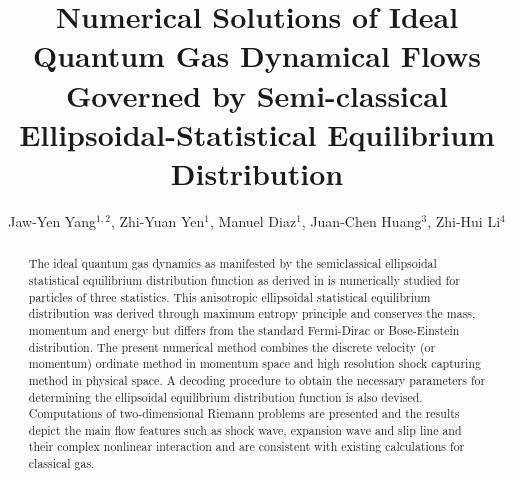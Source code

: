 \documentclass{rsproca}%
\begin{document}
\title{Numerical Solutions of Ideal Quantum Gas Dynamical Flows Governed by Semi-classical Ellipsoidal-Statistical Equilibrium Distribution}

\author{%
Jaw-Yen Yang$^{1,2}$, Zhi-Yuan Yen$^{1}$, Manuel Diaz$^{1}$, Juan-Chen Huang$^{3}$, Zhi-Hui Li$^{4}$}

\address{$^{1}$Institute of Applied Mechanics, National Taiwan University, Taipei 10764, TAIWAN\\
$^{2}$Center for Advanced Study in Theoretical Science, National Taiwan University, Taipei 10764, TAIWAN\\
$^{3}$Department of Merchant, National Taiwan Ocean University, Taipei 10764, TAIWAN\\
$^{4}$China Aerodynamics Research and Development Center, Mianyang, 10764, CHINA}


\subject{Mesoscopic Methods, Semi-classical Botlzmann Transport, Ellipsoidal Statistics, Kinetic Theory, Quantum shock waves}



\begin{abstract}
The ideal quantum gas dynamics as manifested by the semiclassical ellipsoidal statistical equilibrium distribution function as derived in \cite{Wu2012} is numerically studied for particles of three statistics.  This anisotropic ellipsoidal statistical equilibrium distribution was derived through maximum entropy principle and conserves the mass, momentum and energy but differs from the standard Fermi-Dirac or Bose-Einstein distribution. The present numerical method combines the discrete velocity (or momentum) ordinate method in momentum space and high resolution shock capturing method in physical space.   A decoding procedure to obtain the necessary parameters for determining the ellipsoidal equilibrium distribution function is also devised.  Computations of two-dimensional Riemann problems are presented and the results depict the main flow features such as shock wave, expansion wave and slip line and their  complex nonlinear interaction and are consistent with existing calculations for classical gas.
\end{abstract}
\end{document}

